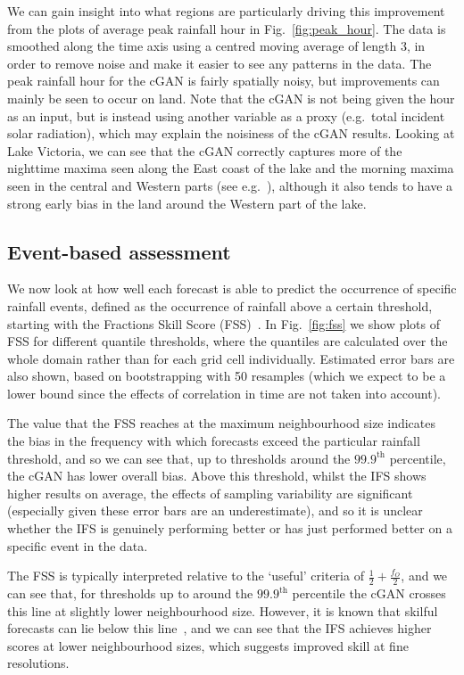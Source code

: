 \documentclass{article}
\begin{document}
We can gain insight into what regions are particularly driving this improvement from the plots of average peak rainfall hour in Fig.~\ref{fig:peak_hour}. The data is smoothed along the time axis using a centred moving average of length 3, in order to remove noise and make it easier to see any patterns in the data. The peak rainfall hour for the cGAN is fairly spatially noisy, but improvements can mainly be seen to occur on land. Note that the cGAN is not being given the hour as an input, but is instead using another variable as a proxy (e.g.~total incident solar radiation), which may explain the noisiness of the cGAN results. Looking at Lake Victoria, we can see that the cGAN correctly captures more of the nighttime maxima seen along the East coast of the lake and the morning maxima seen in the central and Western parts (see e.g.~\cite{woodhams_identifying_2019}), although it also tends to have a strong early bias in the land around the Western part of the lake.


\subsection{Event-based assessment}


We now look at how well each forecast is able to predict the occurrence of specific rainfall events, defined as the occurrence of rainfall above a certain threshold, starting with the Fractions Skill Score (FSS)~\citep{roberts_assessing_2008, roberts_scale-selective_2008}. In Fig.~\ref{fig:fss} we show plots of FSS for different quantile thresholds, where the quantiles are calculated over the whole domain rather than for each grid cell individually. Estimated error bars are also shown, based on bootstrapping with 50 resamples (which we expect to be a lower bound since the effects of correlation in time are not taken into account). 

The value that the FSS reaches at the maximum neighbourhood size indicates the bias in the frequency with which forecasts exceed the particular rainfall threshold, and so we can see that, up to thresholds around the $99.9^{\text{th}}$ percentile, the cGAN has lower overall bias. Above this threshold, whilst the IFS shows higher results on average, the effects of sampling variability are significant (especially given these error bars are an underestimate), and so it is unclear whether the IFS is genuinely performing better or has just performed better on a specific event in the data. 

The FSS is typically interpreted relative to the `useful' criteria of $\frac{1}{2} + \frac{f_O}{2}$, and we can see that, for thresholds up to around the $99.9^{\text{th}}$ percentile the cGAN crosses this line at slightly lower neighbourhood size. However, it is known that skilful forecasts can lie below this line~\citep{nachamkin_applying_2015, mittermaier_long-term_2013}, and we can see that the IFS achieves higher scores at lower neighbourhood sizes, which suggests improved skill at fine resolutions. 
\end{document}

